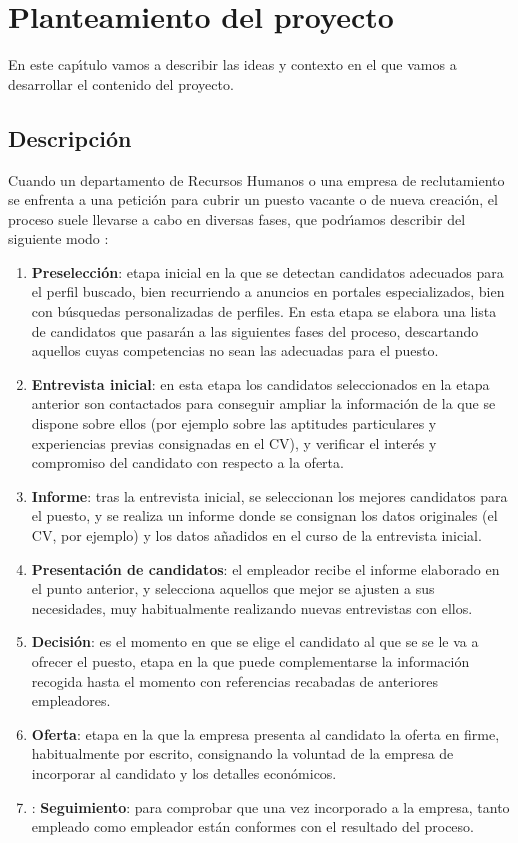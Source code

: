 
\chapter{Planteamiento del proyecto}

En este cap\'\i tulo vamos a describir las ideas y contexto en el que vamos a desarrollar el contenido del proyecto.

\section{Descripci\'on}
Cuando un departamento de Recursos Humanos o una empresa de reclutamiento se enfrenta a una petici\'on para
cubrir un puesto vacante o de nueva creaci\'on, el proceso suele llevarse a cabo en diversas fases, que 
podr\'\i amos describir del siguiente modo \cite{proceso_seleccion1}:
\begin{enumerate}
\item {\bf Preselección}: etapa inicial en la que se detectan candidatos adecuados para el perfil buscado, bien recurriendo a 
anuncios en portales especializados, bien con b\'usquedas personalizadas de perfiles. En esta etapa se elabora una lista 
de candidatos que pasar\'an a las siguientes fases del proceso, descartando aquellos cuyas competencias no sean las adecuadas
para el puesto. 
\item {\bf Entrevista inicial}: en esta etapa los candidatos seleccionados en la etapa anterior son contactados para  
conseguir ampliar la informaci\'on de la que se dispone sobre ellos  (por ejemplo sobre las aptitudes
particulares y experiencias previas consignadas en el CV), y verificar el inter\'es y compromiso del candidato
con respecto a la oferta.
\item {\bf Informe}: tras la entrevista inicial, se seleccionan los mejores candidatos para el puesto, y se realiza un informe
donde se consignan los datos originales (el CV, por ejemplo) y los datos a\~nadidos en el curso de la entrevista inicial.
\item {\bf Presentaci\'on de candidatos}: el empleador recibe el informe elaborado en el punto anterior, y selecciona aquellos
que mejor se ajusten a sus necesidades, muy habitualmente realizando nuevas entrevistas con ellos.
\item {\bf Decisi\'on}: es el momento en que se elige el candidato al que se se le va a ofrecer el puesto, etapa en la 
que puede complementarse la informaci\'on recogida hasta el momento con referencias recabadas de anteriores empleadores.
\item {\bf Oferta}: etapa en la que la empresa presenta al candidato la oferta en firme, habitualmente por escrito, consignando 
la voluntad de la empresa de incorporar al candidato y los detalles econ\'omicos. 
\item: {\bf Seguimiento}:  para comprobar que una vez incorporado a la empresa, tanto empleado como empleador est\'an conformes con
el resultado del proceso.
\end{enumerate}

